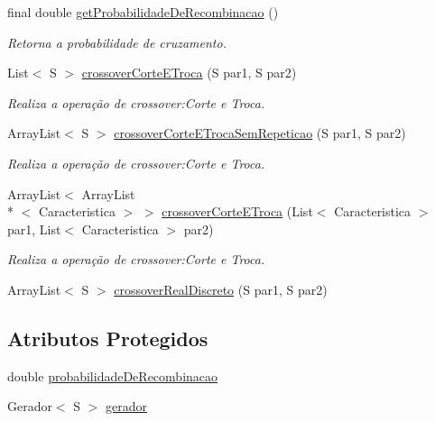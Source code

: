 \begin{DoxyCompactItemize}
final double \hyperlink{classic_1_1populacional_1_1algoritmo_1_1operadores_1_1_recombinador_3_01_s_01extends_01_ser_01_4_ad9e5eef2dc81c197263e6e93da70e900}{get\-Probabilidade\-De\-Recombinacao} ()
\begin{DoxyCompactList}\small\item\em Retorna a probabilidade de cruzamento. \end{DoxyCompactList}\item 
List$<$ S $>$ \hyperlink{classic_1_1populacional_1_1algoritmo_1_1operadores_1_1_recombinador_3_01_s_01extends_01_ser_01_4_af5e6723bcda7ad9276963004e2c89851}{crossover\-Corte\-E\-Troca} (S par1, S par2)
\begin{DoxyCompactList}\small\item\em Realiza a operação de crossover\-:Corte e Troca. \end{DoxyCompactList}\item 
Array\-List$<$ S $>$ \hyperlink{classic_1_1populacional_1_1algoritmo_1_1operadores_1_1_recombinador_3_01_s_01extends_01_ser_01_4_a2eff0b9e55e26ffde90db1674ed31c75}{crossover\-Corte\-E\-Troca\-Sem\-Repeticao} (S par1, S par2)
\begin{DoxyCompactList}\small\item\em Realiza a operação de crossover\-:Corte e Troca. \end{DoxyCompactList}\item 
Array\-List$<$ Array\-List\\*
$<$ Caracteristica $>$ $>$ \hyperlink{classic_1_1populacional_1_1algoritmo_1_1operadores_1_1_recombinador_3_01_s_01extends_01_ser_01_4_a3a335623e11c7ad7f6c013fe57f0f892}{crossover\-Corte\-E\-Troca} (List$<$ Caracteristica $>$ par1, List$<$ Caracteristica $>$ par2)
\begin{DoxyCompactList}\small\item\em Realiza a operação de crossover\-:Corte e Troca. \end{DoxyCompactList}\item 
Array\-List$<$ S $>$ \hyperlink{classic_1_1populacional_1_1algoritmo_1_1operadores_1_1_recombinador_3_01_s_01extends_01_ser_01_4_ad3672036d51fad19ce2f0873508d6a7e}{crossover\-Real\-Discreto} (S par1, S par2)
\end{DoxyCompactItemize}
\subsection*{Atributos Protegidos}
\begin{DoxyCompactItemize}
\item 
double \hyperlink{classic_1_1populacional_1_1algoritmo_1_1operadores_1_1_recombinador_3_01_s_01extends_01_ser_01_4_a2d53817f5d1454f1c428074bc6c82715}{probabilidade\-De\-Recombinacao}
\item 
Gerador$<$ S $>$ \hyperlink{classic_1_1populacional_1_1algoritmo_1_1operadores_1_1_recombinador_3_01_s_01extends_01_ser_01_4_ab5240079f1ed131d203c9bba3c5fdddd}{gerador}
\end{DoxyCompactItemize}


